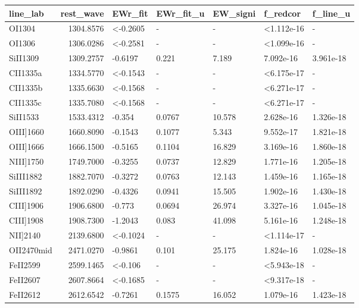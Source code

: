 \begin{tabular}{lrlllll}
\toprule
   line\_lab &  rest\_wave &   EWr\_fit & EWr\_fit\_u & EW\_signi &    f\_redcor &   f\_line\_u \\
\midrule
     OI1304 &  1304.8576 &  <-0.2605 &         - &        - &  <1.112e-16 &          - \\
     OI1306 &  1306.0286 &  <-0.2581 &         - &        - &  <1.099e-16 &          - \\
   SiII1309 &  1309.2757 &   -0.6197 &     0.221 &    7.189 &   7.092e-16 &  3.961e-18 \\
   CII1335a &  1334.5770 &  <-0.1543 &         - &        - &  <6.175e-17 &          - \\
   CII1335b &  1335.6630 &  <-0.1568 &         - &        - &  <6.271e-17 &          - \\
   CII1335c &  1335.7080 &  <-0.1568 &         - &        - &  <6.271e-17 &          - \\
   SiII1533 &  1533.4312 &    -0.354 &    0.0767 &   10.578 &   2.628e-16 &  1.326e-18 \\
  OIII]1660 &  1660.8090 &   -0.1543 &    0.1077 &    5.343 &   9.552e-17 &  1.821e-18 \\
  OIII]1666 &  1666.1500 &   -0.5165 &    0.1104 &   16.829 &   3.169e-16 &  1.860e-18 \\
  NIII]1750 &  1749.7000 &   -0.3255 &    0.0737 &   12.829 &   1.771e-16 &  1.205e-18 \\
  SiIII1882 &  1882.7070 &   -0.3272 &    0.0763 &   12.143 &   1.459e-16 &  1.165e-18 \\
  SiIII1892 &  1892.0290 &   -0.4326 &    0.0941 &   15.505 &   1.902e-16 &  1.430e-18 \\
  CIII]1906 &  1906.6800 &    -0.773 &    0.0694 &   26.974 &   3.327e-16 &  1.045e-18 \\
  CIII]1908 &  1908.7300 &   -1.2043 &     0.083 &   41.098 &   5.161e-16 &  1.248e-18 \\
   NII]2140 &  2139.6800 &  <-0.1024 &         - &        - &  <1.114e-17 &          - \\
 OII2470mid &  2471.0270 &   -0.9861 &     0.101 &   25.175 &   1.824e-16 &  1.028e-18 \\
   FeII2599 &  2599.1465 &   <-0.106 &         - &        - &  <5.943e-18 &          - \\
   FeII2607 &  2607.8664 &  <-0.1685 &         - &        - &  <9.317e-18 &          - \\
   FeII2612 &  2612.6542 &   -0.7261 &    0.1575 &   16.052 &   1.079e-16 &  1.423e-18 \\

\end{tabular}
